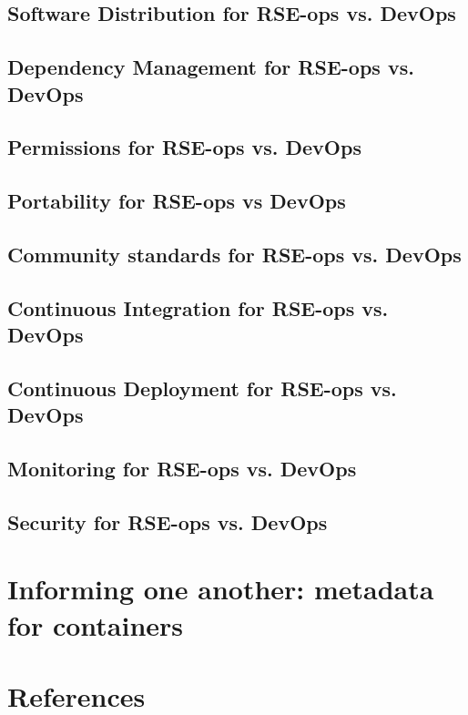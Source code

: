 \documentclass{article}
\begin{document}
\subsection{Software Distribution for RSE-ops vs. DevOps}


\subsection{Dependency Management for RSE-ops vs. DevOps}


\subsection{Permissions for RSE-ops vs. DevOps}


\subsection{Portability for RSE-ops vs DevOps}


\subsection{Community standards for RSE-ops vs. DevOps}


\subsection{Continuous Integration for RSE-ops vs. DevOps}


\subsection{Continuous Deployment for RSE-ops vs. DevOps}


\subsection{Monitoring for RSE-ops vs. DevOps}


\subsection{Security for RSE-ops vs. DevOps}





\section{Informing one another: metadata for containers}





\section{References}


\end{document}
